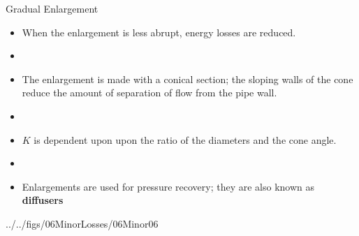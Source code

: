 \documentclass[9pt,xcolor={svgnames, x11names},professionalfonts, mathserif]{beamer}
\begin{document}

\begin{frame}{Gradual Enlargement}

 \begin{itemize}

  \item When the enlargement is less abrupt, energy losses are reduced.
  \item []
  \item The enlargement is made with a conical section; the sloping walls of the cone reduce the amount of separation
        of flow from the pipe wall.
  \item []
  \item $K$ is dependent upon upon the ratio of the diameters and the cone angle.
  \item []
  \item Enlargements are used for pressure recovery; they are also known as \textbf{diffusers}
 \end{itemize}
 \begin{cfig}[0.35]{../../figs/06MinorLosses/06Minor06}\end{cfig}

\end{frame}

\end{document}
